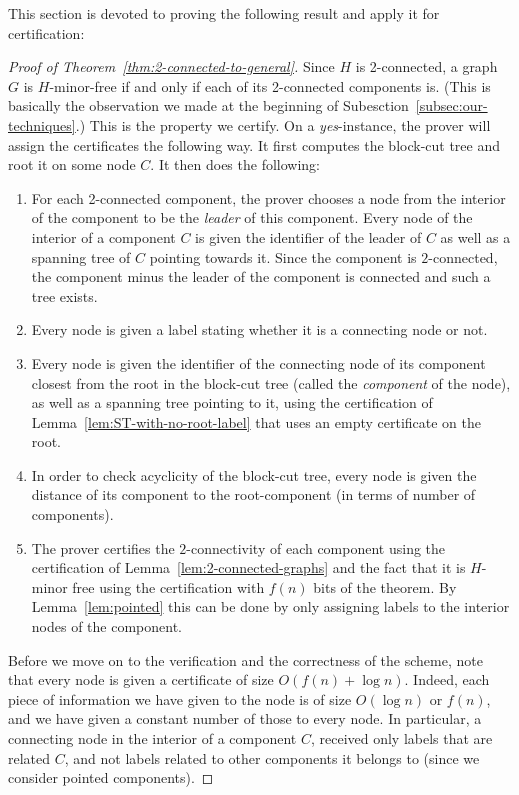 \documentclass[a4paper,thm-restate,USenglish]{lipics-v2019}
\begin{document}
This section is devoted to proving the following result and apply it for certification:

\ThmTwoConnected*

\begin{proof}[Proof of Theorem~\ref{thm:2-connected-to-general}]
Since $H$ is 2-connected, a graph $G$ is $H$-minor-free if and only if each of its 2-connected components is. (This is basically the observation we made at the beginning of Subesction~\ref{subsec:our-techniques}.) 
This is the property we certify. On a \emph{yes}-instance, the prover will assign the certificates the following way. It first computes the block-cut tree and root it on some node $C$.  It then does the following:
\begin{enumerate}
    \item For each 2-connected component, the prover chooses a node from the interior of the component to be the \emph{leader} of this component.
    Every node of the interior of a component $C$ is given the identifier of the leader of $C$ as well as a spanning tree of $C$ pointing towards it. Since the component is $2$-connected, the component minus the leader of the component is connected and such a tree exists. 
    
    \item Every node is given a label stating whether it is a connecting node or not.

    \item Every node is given the identifier of the connecting node of its component closest from the root in the block-cut tree (called the \emph{component} of the node), as well as a spanning tree pointing to it, using the certification of Lemma~\ref{lem:ST-with-no-root-label} that uses an empty certificate on the root.
    
    \item In order to check acyclicity of the block-cut tree, every node is given the distance of its component to the root-component (in terms of number of components).
    
    \item The prover certifies the $2$-connectivity of each component using the certification of Lemma~\ref{lem:2-connected-graphs} and the fact that it is $H$-minor free using the certification with $f(n)$ bits of the theorem. By Lemma~\ref{lem:pointed} this can be done by only  assigning labels to the interior nodes of the component.
\end{enumerate}

Before we move on to the verification and the correctness of the scheme, note that every node is given a certificate of size $O(f(n)+\log n)$. Indeed, each piece of information we have given to the node is of size $O(\log n)$ or $f(n)$, and we have given a constant number of those to every node. 
In particular, a connecting node in the interior of a component $C$, received only labels that are related $C$, and not labels related to other components it belongs to (since we consider pointed components). 



\end{proof}
\end{document}
